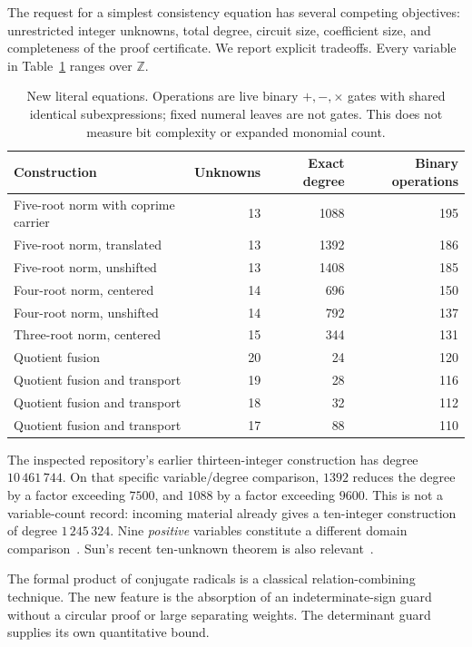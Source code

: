 \documentclass[11pt,a4paper]{article}
\theoremstyle{definition}\newtheorem{definition}[theorem]{Definition}
\theoremstyle{remark}\newtheorem{remark}[theorem]{Remark}
\newcommand{\Z}{\mathbb Z}\newcommand{\Q}{\mathbb Q}\newcommand{\N}{\mathbb N}
\numberwithin{equation}{section}
\begin{document}
The request for a simplest consistency equation has several competing
objectives: unrestricted integer unknowns, total degree, circuit size,
coefficient size, and completeness of the proof certificate. We report
explicit tradeoffs. Every variable in Table~\ref{tab:new} ranges over \(\Z\).
\begin{table}[ht]\centering
\begin{tabular}{lrrr}\toprule
Construction & Unknowns & Exact degree & Binary operations\\\midrule
Five-root norm with coprime carrier &13&1088&195\\
Five-root norm, translated &13&1392&186\\
Five-root norm, unshifted &13&1408&185\\
Four-root norm, centered &14&696&150\\
Four-root norm, unshifted &14&792&137\\
Three-root norm, centered &15&344&131\\
Quotient fusion &20&24&120\\
Quotient fusion and transport &19&28&116\\
Quotient fusion and transport &18&32&112\\
Quotient fusion and transport &17&88&110\\\bottomrule
\end{tabular}
\caption{New literal equations. Operations are live binary \(+,-,\times\)
gates with shared identical subexpressions; fixed numeral leaves are not
gates. This does not measure bit complexity or expanded monomial count.}
\label{tab:new}\end{table}

The inspected repository's earlier thirteen-integer construction has
degree \(10\,461\,744\). On that specific variable/degree comparison,
\(1392\) reduces the degree by a factor exceeding \(7500\), and
\(1088\) by a factor exceeding \(9600\).
This is not a variable-count record: incoming material already gives
a ten-integer construction of degree \(1\,245\,324\).
Nine \emph{positive} variables constitute a different domain
comparison~\cite{repo,frontier,incoming}. Sun's recent ten-unknown
theorem is also relevant~\cite{sun2026}.

The formal product of conjugate radicals is a classical
relation-combining technique. The new feature is the absorption of an
indeterminate-sign guard without a circular proof or large separating
weights. The determinant guard supplies its own quantitative bound.
\end{document}
